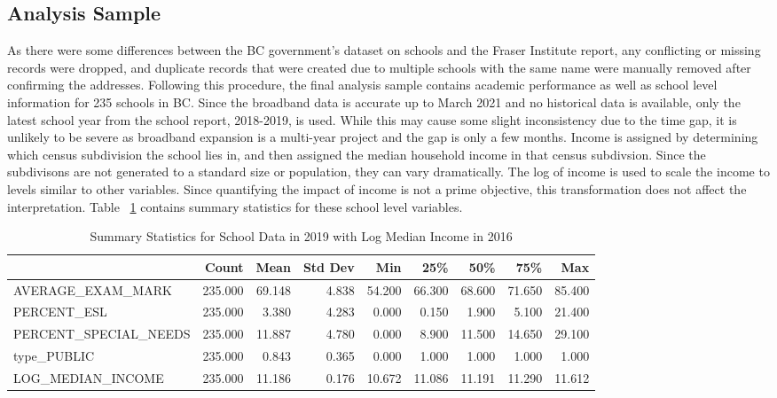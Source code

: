 \documentclass[stu, floatsintext]{apa7}
\begin{document}
    \subsection{Analysis Sample}
    As there were some differences between the BC government's dataset on schools and the Fraser Institute report, any conflicting or missing records were dropped, and duplicate records that were created due to multiple schools with the same name were manually removed after confirming the addresses. Following this procedure, the final analysis sample contains academic performance as well as school level information for 235 schools in BC. Since the broadband data is accurate up to March 2021 and no historical data is available, only the latest school year from the school report, 2018-2019, is used. While this may cause some slight inconsistency due to the time gap, it is unlikely to be severe as broadband expansion is a multi-year project and the gap is only a few months. Income is assigned by determining which census subdivision the school lies in, and then assigned the median household income in that census subdivsion. Since the subdivisons are not generated to a standard size or population, they can vary dramatically. The log of income is used to scale the income to levels similar to other variables. Since quantifying the impact of income is not a prime objective, this transformation does not affect the interpretation. Table ~\ref{tab:fraserSummary} contains summary statistics for these school level variables.

\begin{table}[]
    \caption{Summary Statistics for School Data in 2019 with Log Median Income in 2016}
    \label{tab:fraserSummary}
    \centering
    \begin{adjustbox}{max width=\textwidth}
        \begin{tabular}{lrrrrrrrr}
            \hline
                                    & Count   & Mean   & Std Dev & Min    & 25\%   & 50\%   & 75\%   & Max    \\
            \hline
            AVERAGE\_EXAM\_MARK     & 235.000 & 69.148 & 4.838   & 54.200 & 66.300 & 68.600 & 71.650 & 85.400 \\
            PERCENT\_ESL            & 235.000 & 3.380  & 4.283   & 0.000  & 0.150  & 1.900  & 5.100  & 21.400 \\
            PERCENT\_SPECIAL\_NEEDS & 235.000 & 11.887 & 4.780   & 0.000  & 8.900  & 11.500 & 14.650 & 29.100 \\
            type\_PUBLIC            & 235.000 & 0.843  & 0.365   & 0.000  & 1.000  & 1.000  & 1.000  & 1.000  \\
            LOG\_MEDIAN\_INCOME     & 235.000 & 11.186 & 0.176   & 10.672 & 11.086 & 11.191 & 11.290 & 11.612 \\
            \hline
        \end{tabular}%
    \end{adjustbox}
\end{table}
\end{document}
